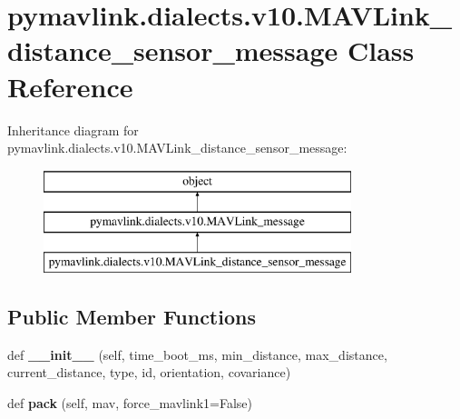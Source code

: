 \hypertarget{classpymavlink_1_1dialects_1_1v10_1_1MAVLink__distance__sensor__message}{}\section{pymavlink.\+dialects.\+v10.\+M\+A\+V\+Link\+\_\+distance\+\_\+sensor\+\_\+message Class Reference}
\label{classpymavlink_1_1dialects_1_1v10_1_1MAVLink__distance__sensor__message}
Inheritance diagram for pymavlink.\+dialects.\+v10.\+M\+A\+V\+Link\+\_\+distance\+\_\+sensor\+\_\+message\+:\begin{figure}[H]
\begin{center}
\leavevmode
\includegraphics[height=3.000000cm]{classpymavlink_1_1dialects_1_1v10_1_1MAVLink__distance__sensor__message}
\end{center}
\end{figure}
\subsection*{Public Member Functions}
\begin{DoxyCompactItemize}
\item 
\mbox{\label{classpymavlink_1_1dialects_1_1v10_1_1MAVLink__distance__sensor__message_a063bbd2d5842f8164df5ca840002bf68}} 
def {\bfseries \+\_\+\+\_\+init\+\_\+\+\_\+} (self, time\+\_\+boot\+\_\+ms, min\+\_\+distance, max\+\_\+distance, current\+\_\+distance, type, id, orientation, covariance)
\item 
\mbox{\label{classpymavlink_1_1dialects_1_1v10_1_1MAVLink__distance__sensor__message_a5896526c28692bc74e75ebd1d752756f}} 
def {\bfseries pack} (self, mav, force\+\_\+mavlink1=False)
\end{DoxyCompactItemize}
